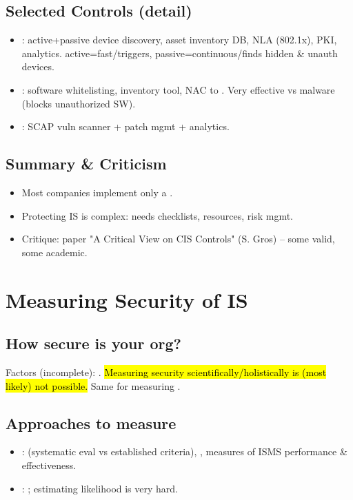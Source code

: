 \subsection{Selected Controls (detail)}
\begin{itemize}
\item {}: active+passive device discovery, asset inventory DB, NLA (802.1x), PKI, analytics.  active=fast/triggers, passive=continuous/finds hidden \& unauth devices.
\item {}: software whitelisting, inventory tool, NAC to . Very effective vs malware (blocks unauthorized SW).
\item {}: SCAP vuln scanner + patch mgmt + analytics.
\end{itemize}

\subsection{Summary \& Criticism}
\begin{itemize}
\item Most companies implement only a .
\item Protecting IS is complex: needs checklists, resources, risk mgmt.
\item Critique: paper "A Critical View on CIS Controls" (S. Gros) -- some valid, some academic.
\end{itemize}

\section{Measuring Security of IS}

\subsection{How secure is your org?}
Factors (incomplete): .
\hl{Measuring security scientifically/holistically is (most likely) not possible.} Same for measuring .

\subsection{Approaches to measure}
\begin{itemize}
\item {}:  (systematic eval vs established criteria), , measures of ISMS performance \& effectiveness.
\item {}: ; estimating likelihood is very hard.
\end{itemize}

